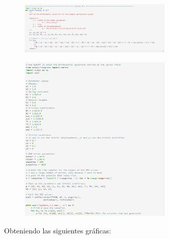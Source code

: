 \documentclass[a4paper]{article}
\begin{document}
\begin{center}
\begin{figure}[ht!]
 \centering
  \includegraphics[width=0.65\textwidth]{Codigo6.PNG}
\end{figure}
\begin{figure}[ht!]
 \centering
  \includegraphics[width=0.65\textwidth]{Codigo7.png}
\end{figure}

Obteniendo las siguientes gráficas:


\end{center}
\end{document}
